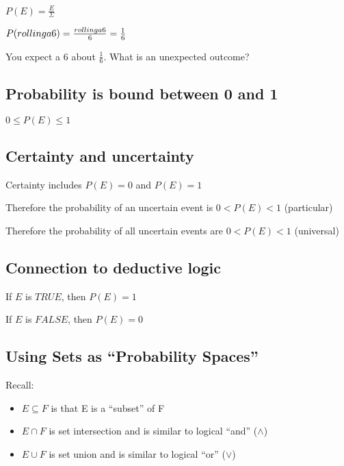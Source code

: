 \documentclass[
]{book}
\providecommand{\tightlist}{%
  \setlength{\itemsep}{0pt}\setlength{\parskip}{0pt}}
\begin{document}
\(P(E) = \frac{E}{\Sigma}\)

\(P(rolling \space a\space 6) = \frac{rolling \space a\space 6}{6} = \frac{1}{6}\)

You expect a 6 about \(\frac{1}{6}\). What is an unexpected outcome?

\hypertarget{probability-is-bound-between-0-and-1}{%
\subsection{Probability is bound between 0 and 1}\label{probability-is-bound-between-0-and-1}}

\(0 \le P(E) \le 1\)

\hypertarget{certainty-and-uncertainty}{%
\subsection{Certainty and uncertainty}\label{certainty-and-uncertainty}}

Certainty includes \(P(E) = 0\) and \(P(E) = 1\)

Therefore the probability of an uncertain event is \(0 < P(E) < 1\) (particular)

Therefore the probability of all uncertain events are \(0 < P(E) < 1\) (universal)

\hypertarget{connection-to-deductive-logic}{%
\subsection{Connection to deductive logic}\label{connection-to-deductive-logic}}

If \(E\) is \(TRUE\), then \(P(E) = 1\)

If \(E\) is \(FALSE\), then \(P(E) = 0\)

\hypertarget{using-sets-as-probability-spaces}{%
\subsection{Using Sets as ``Probability Spaces''}\label{using-sets-as-probability-spaces}}

Recall:

\begin{itemize}
\tightlist
\item
  \(E \subseteq F\) is that E is a ``subset'' of F
\item
  \(E \cap F\) is set intersection and is similar to logical ``and'' (\(\land\))
\item
  \(E \cup F\) is set union and is similar to logical ``or'' (\(\lor\))
\end{itemize}
\end{document}
